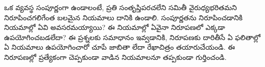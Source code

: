 \documentclass[../../../include/open-logic-section]{subfiles}
\begin{document}
\begin{prob}
ఒక  వ్యవస్థ సంపూర్ణంగా ఉండాలంటే, ప్రతి
సంతృప్తిపరచలేని సమితీ వైరుధ్యభరితమని నిరూపించగలిగేంత బలమైన నియమాలు
దానికి ఉండాలి. సంపూర్ణతను నిరూపించడానికి  నియమాల్లో ఏవి
అవసరమయ్యాయి? ఈ నియమాల్లో ఏవైనా నిరూపణలో ఎక్కడా ఉపయోగించబడలేదా? ఈ
ప్రశ్నలకు సమాధానం ఇవ్వడానికి,
 నిరూపణకు దారితీసే ఏ ఫలితాల్లో
ఏ  నియమాలు ఉపయోగించారో చూపే జాబితా లేదా రేఖాచిత్రం
తయారుచేయండి. ఈ నిరూపణల్లో ప్రత్యేకంగా చెప్పకుండా వాడిన నియమాలనూ తప్పకుండా
గుర్తించండి.
\end{prob}
\tagendprob
\end{document}
